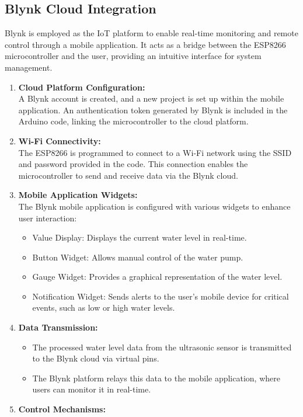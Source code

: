 {\subsection{Blynk Cloud Integration}
Blynk is employed as the IoT platform to enable real-time monitoring and remote control through a mobile application. It acts as a bridge between the ESP8266 microcontroller and the user, providing an intuitive interface for system management.
\begin{enumerate}
  \item \textbf{Cloud Platform Configuration:}\\
    A Blynk account is created, and a new project is set up within the mobile application.
    An authentication token generated by Blynk is included in the Arduino code, linking the microcontroller to the cloud platform.
  \item \textbf{Wi-Fi Connectivity:}\\
    The ESP8266 is programmed to connect to a Wi-Fi network using the SSID and password provided in the code. This connection enables the microcontroller to send and receive data via the Blynk cloud.
  \item \textbf{Mobile Application Widgets:}\\
    The Blynk mobile application is configured with various widgets to enhance user interaction:
    \begin{itemize}
      \item Value Display: Displays the current water level in real-time.
      \item Button Widget: Allows manual control of the water pump.
      \item Gauge Widget: Provides a graphical representation of the water level.
      \item Notification Widget: Sends alerts to the user’s mobile device for critical events, such as low or high water levels.
    \end{itemize}
  \item \textbf{Data Transmission:}
    \begin{itemize}
      \item The processed water level data from the ultrasonic sensor is transmitted to the Blynk cloud via virtual pins.
      \item The Blynk platform relays this data to the mobile application, where users can monitor it in real-time.
    \end{itemize}
  \item \textbf{Control Mechanisms:}

\end{enumerate}}

